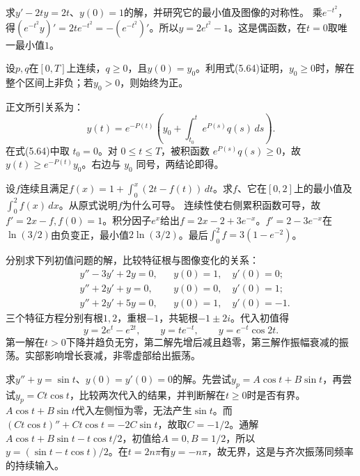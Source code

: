 求\(y'-2ty=2t\)、\(y(0)=1\)的解，并研究它的最小值及图像的对称性。
\solutionanswer
乘\(e^{-t^2}\)，得\((e^{-t^2}y)'=2te^{-t^2}=-(e^{-t^2})'\)。所以\(y=2e^{t^2}-1\)。这是偶函数，在\(t=0\)取唯一最小值\(1\)。


设\(p,q\)在\([0,T]\)上连续，\(q\ge0\)，且\(y(0)=y_0\)。利用式\textup{(5.64)}证明，\(y_0\ge0\)时，解在整个区间上非负；若\(y_0>0\)，则始终为正。

\par\smallskip\noindent 正文所引关系为：
\begin{equation*}
y(t)=e^{-P(t)}\left(y_0+\int_{t_0}^t e^{P(s)}q(s)\,ds\right).
\end{equation*}
\solutionanswer
在式\textup{(5.64)}中取 \(t_0=0\)。对 \(0\le t\le T\)，被积函数 \(e^{P(s)}q(s)\ge0\)，故 \(y(t)\ge e^{-P(t)}y_0\)。右边与 \(y_0\) 同号，两结论即得。


设\(f\)连续且满足\(f(x)=1+\int_0^x(2t-f(t))\,dt\)。求\(f\)、它在\([0,2]\)上的最小值及\(\int_0^2 f(x)\,dx\)。从原式说明\(f\)为什么可导。
\solutionanswer
连续性使右侧累积函数可导，故\(f'=2x-f,f(0)=1\)。积分因子\(e^x\)给出\(f=2x-2+3e^{-x}\)。\(f'=2-3e^{-x}\)在\(\ln(3/2)\)由负变正，最小值\(2\ln(3/2)\)。最后\(\int_0^2f=3(1-e^{-2})\)。


分别求下列初值问题的解，比较特征根与图像变化的关系：
\begin{equation*}
 \begin{aligned}
 &y''-3y'+2y=0,&&y(0)=1,\quad y'(0)=0;\\
 &y''+2y'+y=0,&&y(0)=0,\quad y'(0)=1;\\
 &y''+2y'+5y=0,&&y(0)=1,\quad y'(0)=-1.
 \end{aligned}
\end{equation*}
\solutionanswer
三个特征方程分别有根\(1,2\)，重根\(-1\)，共轭根\(-1\pm2i\)。代入初值得
\[
 y=2e^t-e^{2t},\qquad y=te^{-t},\qquad y=e^{-t}\cos2t.
\]
第一解在\(t>0\)下降并趋负无穷，第二解先增后减且趋零，第三解作振幅衰减的振荡。实部影响增长衰减，非零虚部给出振荡。


求\(y''+y=\sin t\)、\(y(0)=y'(0)=0\)的解。先尝试\(y_p=A\cos t+B\sin t\)，再尝试\(y_p=Ct\cos t\)，比较两次代入的结果，并判断解在\(t\ge0\)时是否有界。
\solutionanswer
\(A\cos t+B\sin t\)代入左侧恒为零，无法产生\(\sin t\)。而\((Ct\cos t)''+Ct\cos t=-2C\sin t\)，故取\(C=-1/2\)。通解\(A\cos t+B\sin t-t\cos t/2\)，初值给\(A=0,B=1/2\)，所以\(y=(\sin t-t\cos t)/2\)。在\(t=2n\pi\)有\(y=-n\pi\)，故无界，这是与齐次振荡同频率的持续输入。


